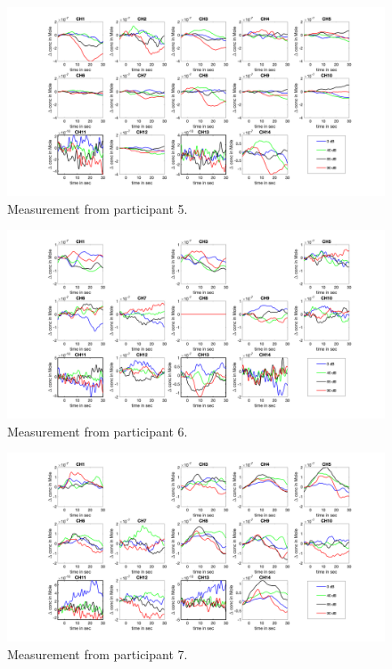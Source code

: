 \begin{figure}[H]
  \centering
    \includegraphics[scale=.4]{bilder/HbR_Mole/sub_lukas_s_HbR.png}
  \caption{Measurement from participant 5.}
  \label{fig:somesignal}
\end{figure}

\begin{figure}[H]
  \centering
    \includegraphics[scale=.4]{bilder/HbR_Mole/sub_shelia_s_HbR.png}
  \caption{Measurement from participant 6.}
  \label{fig:somesignal}
\end{figure}

\begin{figure}[H]
  \centering
    \includegraphics[scale=.4]{bilder/HbR_Mole/sub_liao_s_HbR.png}
  \caption{Measurement from participant 7.}
  \label{fig:somesignal}
\end{figure}


